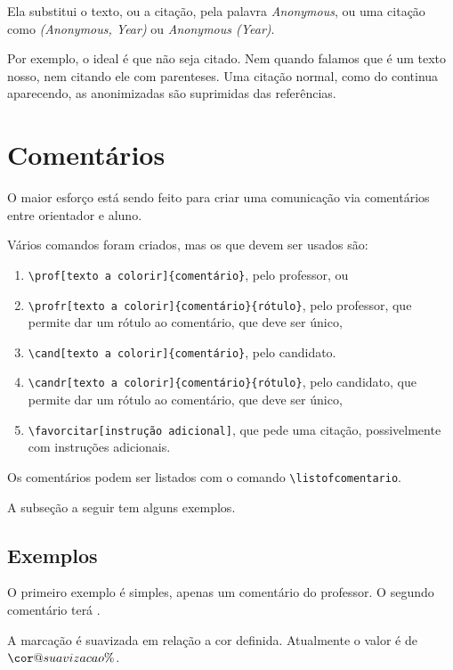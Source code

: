 \documentclass{article}
\begin{document}
Ela substitui o texto, ou a citação, pela palavra \textit{Anonymous}, ou uma citação como \textit{(Anonymous, Year)} ou \textit{Anonymous (Year)}.

Por exemplo, o ideal é que  não seja citado. Nem quando falamos que  é um texto nosso, nem citando ele com parenteses. Uma citação normal, como do \citet{Juran2010} continua aparecendo, as anonimizadas são suprimidas das referências.

\section{Comentários}

O maior esforço está sendo feito para criar uma comunicação via comentários entre orientador e aluno. 

Vários comandos foram criados, mas os que devem ser usados são:
\begin{enumerate}
\item \verb!\prof[texto a colorir]{comentário}!, pelo professor, ou
\item \verb!\profr[texto a colorir]{comentário}{rótulo}!, pelo professor, que permite dar um rótulo ao comentário, que deve ser único, 
\item \verb!\cand[texto a colorir]{comentário}!, pelo candidato.
\item \verb!\candr[texto a colorir]{comentário}{rótulo}!, pelo candidato, que permite dar um rótulo ao comentário, que deve ser único, 
\item \verb!\favorcitar[instrução adicional]!, que pede uma citação, possivelmente com instruções adicionais.
\end{enumerate}

Os comentários podem ser listados com o comando \verb!\listofcomentario!.

A subseção a seguir  tem alguns exemplos.

\subsection{Exemplos}

O primeiro exemplo é simples, apenas um comentário do professor. O segundo comentário terá . 

A marcação é suavizada em relação a cor definida. Atualmente o valor é de \makeatletter$\cor@suavizacao\%$\makeatother.
\end{document}
